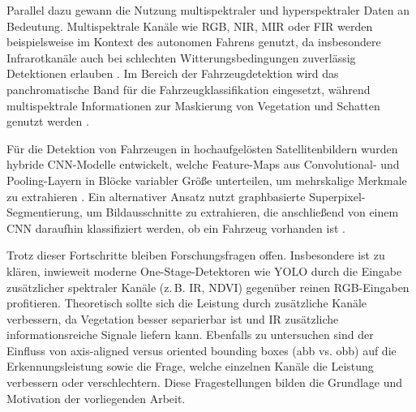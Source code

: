 Parallel dazu gewann die Nutzung multispektraler und hyperspektraler Daten an Bedeutung. Multispektrale Kanäle wie RGB, NIR, MIR oder FIR werden beispielsweise im Kontext des autonomen Fahrens genutzt, da insbesondere Infrarotkanäle auch bei schlechten Witterungsbedingungen zuverlässig Detektionen erlauben \cite{Takumi2017}. Im Bereich der Fahrzeugdetektion wird das panchromatische Band für die Fahrzeugklassifikation eingesetzt, während multispektrale Informationen zur Maskierung von Vegetation und Schatten genutzt werden \cite{Eikvil2009}.

Für die Detektion von Fahrzeugen in hochaufgelösten Satellitenbildern wurden hybride CNN-Modelle entwickelt, welche Feature-Maps aus Convolutional- und Pooling-Layern in Blöcke variabler Größe unterteilen, um mehrskalige Merkmale zu extrahieren \cite{XueyunChen2014}. Ein alternativer Ansatz nutzt graphbasierte Superpixel-Segmentierung, um Bildausschnitte zu extrahieren, die anschließend von einem CNN daraufhin klassifiziert werden, ob ein Fahrzeug vorhanden ist \cite{Jiang2015}.

Trotz dieser Fortschritte bleiben Forschungsfragen offen. Insbesondere ist zu klären, inwieweit moderne One-Stage-Detektoren wie YOLO durch die Eingabe zusätzlicher spektraler Kanäle (z.\,B. IR, NDVI) gegenüber reinen RGB-Eingaben profitieren. Theoretisch sollte sich die Leistung durch zusätzliche Kanäle verbessern, da Vegetation besser separierbar ist und IR zusätzliche informationsreiche Signale liefern kann. Ebenfalls zu untersuchen sind der Einfluss von axis-aligned versus oriented bounding boxes (abb vs. obb) auf die Erkennungsleistung sowie die Frage, welche einzelnen Kanäle die Leistung verbessern oder verschlechtern. Diese Fragestellungen bilden die Grundlage und Motivation der vorliegenden Arbeit.



